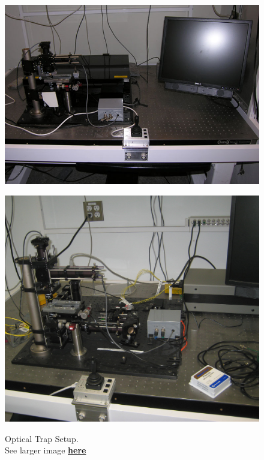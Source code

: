 \documentclass{../lab}
\begin{document}
\begin{figure}[h]
\begin{minipage}{0.35\textwidth}
    \href{http://experimentationlab.berkeley.edu/sites/default/files/images/OTZ_0141B.jpg}{\includegraphics[width=\linewidth,keepaspectratio]{images/OTZ_0141B.jpg}}
    \caption{Optical Trap Setup. \\ See larger image \href{http://experimentationlab.berkeley.edu/sites/default/files/images/OTZ_0141B.jpg}{\textbf{here}}}
\end{minipage}
\begin{minipage}{0.28\textwidth}
    \href{http://experimentationlab.berkeley.edu/sites/default/files/images/OTZ_3551_Crop.jpg}{\includegraphics[width=\linewidth,keepaspectratio]{images/OTZ_3551_Crop.jpg}}

\end{minipage}
\end{figure}
\end{document}
